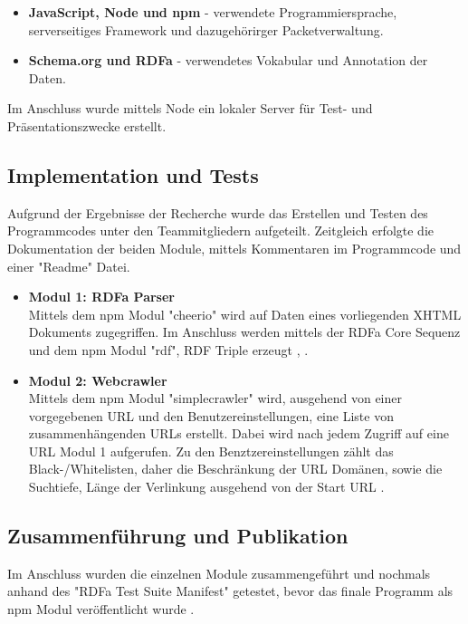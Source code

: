\documentclass[hidelinks, a4paper, 11pt]{article} %
\begin{document}
\begin{itemize}
\item \textbf{JavaScript, Node und npm} - verwendete Programmiersprache, serverseitiges Framework und dazugeh\"orirger Packetverwaltung.
\item \textbf{Schema.org und RDFa} - verwendetes Vokabular und Annotation der Daten.
\end{itemize}

Im Anschluss wurde mittels Node ein lokaler Server für Test- und Pr\"asentationszwecke erstellt.

\subsection{Implementation und Tests}

Aufgrund der Ergebnisse der Recherche wurde das Erstellen und Testen des Programmcodes unter den Teammitgliedern aufgeteilt. Zeitgleich erfolgte die Dokumentation der beiden Module, mittels Kommentaren im Programmcode und einer "Readme" Datei. 

\begin{itemize}
\item \textbf{Modul 1: RDFa Parser} \\
Mittels dem npm Modul "cheerio" wird auf Daten eines vorliegenden XHTML Dokuments zugegriffen. Im Anschluss werden mittels der RDFa Core Sequenz und dem npm Modul "rdf", RDF Triple erzeugt \cite{cheerioModule}, \cite{rdfModule}. 

\item \textbf{Modul 2: Webcrawler} \\
Mittels dem npm Modul "simplecrawler" wird, ausgehend von einer vorgegebenen URL und den Benutzereinstellungen, eine Liste von zusammenhängenden URLs erstellt. Dabei wird nach jedem Zugriff auf eine URL Modul 1 aufgerufen. Zu den Benztzereinstellungen z\"ahlt das Black-/Whitelisten, daher die Beschränkung der URL Dom\"anen, sowie die Suchtiefe, L\"ange der Verlinkung ausgehend von der Start URL \cite{simplecrawlerModule}.
\end{itemize}

\subsection{Zusammenf\"uhrung und Publikation}

Im Anschluss wurden die einzelnen Module zusammengeführt und nochmals anhand des "RDFa Test Suite Manifest" getestet, bevor das finale Programm als npm Modul ver\"offentlicht wurde \cite{rdfaTest}.
\end{document}
